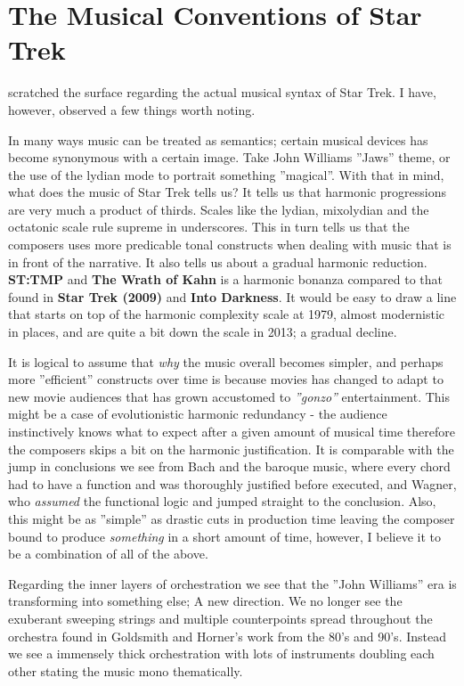 
\chapter{The Musical Conventions of Star Trek}\label{ch:the musical conventions}

 scratched the surface regarding the actual musical syntax of Star Trek. I have, however, observed a few things worth noting. 

In many ways music can be treated as semantics; certain musical devices has become synonymous with a certain image. Take John Williams ''Jaws'' theme, or the use of the lydian mode to portrait something ''magical''. With that in mind, what does the music of Star Trek tells us? It tells us that harmonic progressions are very much a product of thirds. Scales like the lydian, mixolydian  and the octatonic scale rule supreme in underscores. This in turn tells us that the composers uses more predicable tonal constructs when dealing with music that is in front of the narrative. It also tells us about a gradual harmonic reduction. \textbf{ST:TMP} and \textbf{The Wrath of Kahn} is a harmonic bonanza compared to that found in \textbf{Star Trek (2009)} and \textbf{Into Darkness}. It would be easy to draw a line that starts on top of the harmonic complexity scale at 1979, almost modernistic in places, and are quite a bit down the scale in 2013; a gradual decline. 

It is logical to assume that \textit{why} the music overall becomes simpler, and perhaps more ''efficient'' constructs over time is because movies has changed to adapt to new movie audiences that has grown accustomed to \textit{''gonzo''} entertainment. This might be a case of evolutionistic harmonic redundancy - the audience instinctively knows what to expect after a given amount of musical time therefore the composers skips a bit on the harmonic justification. It is comparable with the jump in conclusions we see from Bach and the baroque music, where every chord had to have a function and was thoroughly justified before executed, and Wagner, who \textit{assumed} the functional logic and jumped straight to the conclusion. Also, this might be as ''simple'' as drastic cuts in production time leaving the composer bound to produce \textit{something} in a short amount of time, however, I believe it to be a combination of all of the above.

Regarding the inner layers of orchestration we see that the ''John Williams'' era is transforming into something else; A new direction. We no longer see the exuberant sweeping strings and multiple counterpoints spread throughout the orchestra found in Goldsmith and Horner's work from the 80's and 90's. Instead we see a immensely thick orchestration with lots of instruments doubling each other stating the music mono thematically. 

